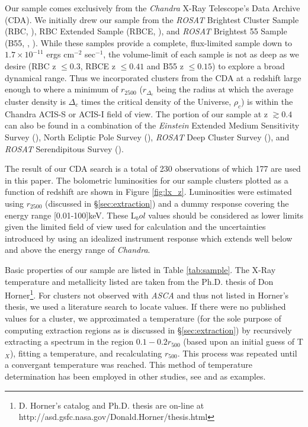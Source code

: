 \documentclass[12pt, preprint]{aastex}
\begin{document}
Our sample comes exclusively from the {\textit{Chandra}} X-Ray
Telescope's Data Archive (CDA). We initially drew our sample from the
{\textit{ROSAT}} Brightest Cluster Sample (RBC,
\cite{1998MNRAS.301..881E}), RBC Extended Sample (RBCE,
\cite{2000MNRAS.318..333E}), and {\textit{ROSAT}} Brightest 55 Sample
(B55, \cite{1990MNRAS.245..559E}, \cite{1998MNRAS.298..416P}). While
these samples provide a complete, flux-limited sample down to
$1.7\times10^{-11}$ ergs cm$^{-2}$ sec$^{-1}$, the volume-limit of each
sample is not as deep as we desire (RBC z $\leq 0.3$, RBCE z
$\leq 0.41$ and B55 z $\leq 0.15$) to explore a broad dynamical
range. Thus we incorporated clusters from the CDA at a redshift large enough
to where a minimum of $r_{2500}$ ($r_{\Delta_c}$ being the radius at which the
average cluster density is $\Delta_c$ times the critical density of the
Universe, $\rho_c$) is within the Chandra ACIS-S or ACIS-I field of
view. The portion of our sample at z $\gtrsim 0.4$ can also be found in a
combination of the {\textit{Einstein}} Extended Medium Sensitivity Survey
(\cite{1990ApJS...72..567G}), North Ecliptic Pole Survey
(\cite{2006ApJS..162..304H}), {\textit{ROSAT}} Deep Cluster Survey
(\cite{1995ApJ...445L..11R}), and {\textit{ROSAT}} Serendipitous Survey
(\cite{1998ApJ...502..558V}).

The result of our CDA search is a total of 230 observations of which
177 are used in this paper. The bolometric luminosities
for our sample clusters plotted as a function of
redshift are shown in Figure \ref{fig:lx_z}. Luminosities
were estimated using $r_{2500}$ (discussed in \S\ref{sec:extraction})
and a dummy response covering the energy range [0.01-100]keV. These L$_bol$ values
should be considered as lower limits given the limited field of view
used for calculation and the uncertainties introduced by using an idealized
instrument response which extends well below and above the energy
range of {\textit{Chandra}}.

Basic properties of our sample are listed in Table \ref{tab:sample}. The X-Ray
temperature and metallicity listed are taken from the Ph.D. thesis of
Don Horner\footnote{D. Horner's catalog and Ph.D. thesis are on-line at
http://asd.gsfc.nasa.gov/Donald.Horner/thesis.html}. For clusters not
observed with {\textit{ASCA}} and thus not listed in Horner's thesis,
we used a literature search to locate values. If there were no
published values for a cluster, we approximated a temperature (for the sole purpose of
computing extraction regions as is discussed in \S\ref{sec:extraction})
by recursively extracting a spectrum in the region $0.1-0.2r_{500}$
(based upon an initial guess of T$_{X}$), fitting a temperature, and
recalculating $r_{500}$. This process was repeated until a convergant
temperature was reached. This method of temperature determination has
been employed in other studies, see \cite{2006MNRAS.tmp.1068S} and
\cite{2006ApJS..162..304H} as examples.
\end{document}
